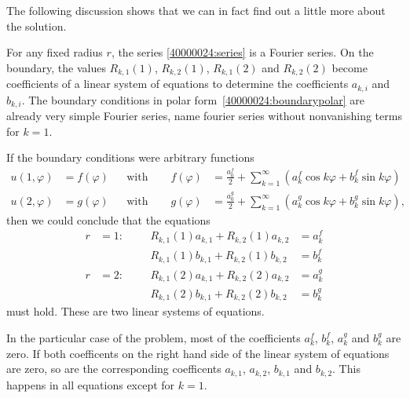 \begin{diskussion}
The following discussion shows that we can in fact find out a little more
about the solution.

For any fixed radius $r$, the series \eqref{40000024:series} is 
a Fourier series.
On the boundary, the values $R_{k,1}(1)$, $R_{k,2}(1)$, $R_{k,1}(2)$ and
$R_{k,2}(2)$ become coefficients of a linear system of equations to
determine the coefficients $a_{k,i}$ and $b_{k,i}$.
The boundary conditions in polar form~\eqref{40000024:boundarypolar}
are already very simple Fourier series, name fourier series without
nonvanishing terms for $k=1$.

If the boundary conditions were arbitrary functions
\begin{align*}
u(1,\varphi)
&=
f(\varphi)
&&\text{with Fourier series} &
f(\varphi)
&=
\frac{a^f_0}2 + \sum_{k=1}^\infty (a^f_k\cos k\varphi + b^f_k\sin k\varphi)
\\
u(2,\varphi)
&=
g(\varphi)
&&\text{with Fourier series}&
g(\varphi)
&=
\frac{a^g_0}2 + \sum_{k=1}^\infty (a^g_k\cos k\varphi + b^g_k\sin k\varphi),
\end{align*}
then we could conclude that the equations
\[
\begin{aligned}
r&=1:&&&
R_{k,1}(1) a_{k,1} + R_{k,2}(1)a_{k,2} &= a_k^f
\\
 &   &&&
R_{k,1}(1) b_{k,1} + R_{k,2}(1)b_{k,2} &= b_k^f
\\[5pt]
r&=2:&&&
R_{k,1}(2) a_{k,1} + R_{k,2}(2)a_{k,2} &= a_k^g
\\
 &   &&&
R_{k,1}(2) b_{k,1} + R_{k,2}(2)b_{k,2} &= b_k^g
\end{aligned}
\]
must hold.
These are two linear systems of equations.

In the particular case of the problem, most of the coefficients
$a_k^f$, $b_k^f$, $a_k^g$ and $b_k^g$ are zero.
If both coefficents on the right hand side of the linear system
of equations are zero, so are the corresponding coefficents
$a_{k,1}$, $a_{k,2}$, $b_{k,1}$ and $b_{k,2}$.
This happens in all equations except for $k=1$.


\end{diskussion}
